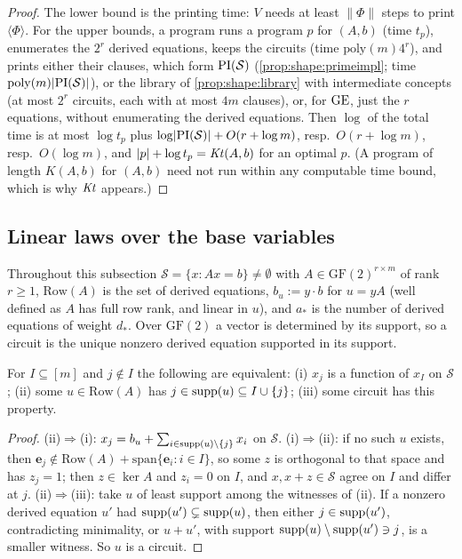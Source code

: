 \begin{proof}
The lower bound is the printing time: $V$ needs at least $\lVert\Phi\rVert$ steps to print $\langle\Phi\rangle$. For the upper bounds, a program runs a program $p$ for $(A,b)$ (time $t_p$), enumerates the $2^r$ derived equations, keeps the circuits (time $\mathrm{poly}(m)4^r$), and prints either their clauses, which form $\mathrm{PI}(\mathcal S)$ (\cref{prop:shape:primeimpl}; time $\mathrm{poly}(m)\lvert\mathrm{PI}(\mathcal S)\rvert$), or the library of \cref{prop:shape:library} with intermediate concepts (at most $2^r$ circuits, each with at most $4m$ clauses), or, for $\mathrm{GE}$, just the $r$ equations, without enumerating the derived equations. Then $\log$ of the total time is at most $\log t_p$ plus $\log\lvert\mathrm{PI}(\mathcal S)\rvert+O(r+\log m)$, resp.\ $O(r+\log m)$, resp.\ $O(\log m)$, and $\lvert p\rvert+\log t_p=\mathit{Kt}(A,b)$ for an optimal $p$. (A program of length $K(A,b)$ for $(A,b)$ need not run within any computable time bound, which is why $\mathit{Kt}$ appears.)
\end{proof}

\subsection{Linear laws over the base variables}\label{app:shape:base}

Throughout this subsection $\mathcal S=\{x:Ax=b\}\ne\emptyset$ with $A\in\mathrm{GF}(2)^{r\times m}$ of rank $r\ge1$, $\mathrm{Row}(A)$ is the set of derived equations, $b_u:=y\cdot b$ for $u=yA$ (well defined as $A$ has full row rank, and linear in $u$), and $a_*$ is the number of derived equations of weight $d_*$. Over $\mathrm{GF}(2)$ a vector is determined by its support, so a circuit is the unique nonzero derived equation supported in its support.

\begin{lemma}[Determination]\label{lem:shape:circuits}
For $I\subseteq[m]$ and $j\notin I$ the following are equivalent: (i) $x_j$ is a function of $x_I$ on $\mathcal S$; (ii) some $u\in\mathrm{Row}(A)$ has $j\in\operatorname{supp}(u)\subseteq I\cup\{j\}$; (iii) some circuit has this property.
\end{lemma}

\begin{proof}
(ii)$\Rightarrow$(i): $x_j=b_u+\sum_{i\in\operatorname{supp}(u)\setminus\{j\}}x_i$ on $\mathcal S$. (i)$\Rightarrow$(ii): if no such $u$ exists, then $\mathbf e_j\notin\mathrm{Row}(A)+\mathrm{span}\{\mathbf e_i:i\in I\}$, so some $z$ is orthogonal to that space and has $z_j=1$; then $z\in\ker A$ and $z_i=0$ on $I$, and $x,x+z\in\mathcal S$ agree on $I$ and differ at $j$. (ii)$\Rightarrow$(iii): take $u$ of least support among the witnesses of (ii). If a nonzero derived equation $u'$ had $\operatorname{supp}(u')\subsetneq\operatorname{supp}(u)$, then either $j\in\operatorname{supp}(u')$, contradicting minimality, or $u+u'$, with support $\operatorname{supp}(u)\setminus\operatorname{supp}(u')\ni j$, is a smaller witness. So $u$ is a circuit.
\end{proof}

